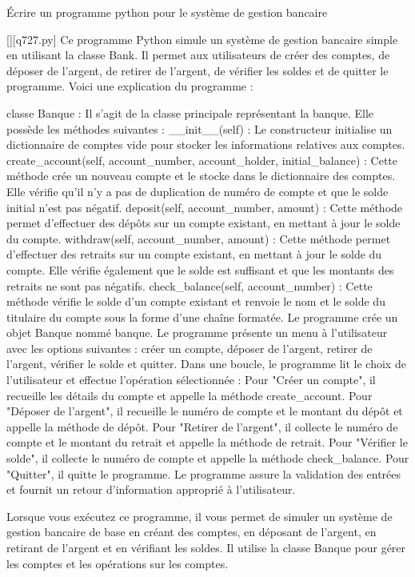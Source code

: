         \question
        Écrire un programme python pour le système de gestion bancaire
        \par
        \begin{solution}
            \renewcommand{\nomfichier}{q727.py}
            \pythonfile{\chemincode \nomfichier}[][\nomfichier]
            Ce programme Python simule un système de gestion bancaire simple en utilisant la classe Bank. Il permet aux utilisateurs de créer des comptes, de déposer de l'argent, de retirer de l'argent, de vérifier les soldes et de quitter le programme. Voici une explication du programme :

    classe Banque : Il s'agit de la classe principale représentant la banque. Elle possède les méthodes suivantes :
        \_\_init\_\_(self) : Le constructeur initialise un dictionnaire de comptes vide pour stocker les informations relatives aux comptes.
        create\_account(self, account\_number, account\_holder, initial\_balance) : Cette méthode crée un nouveau compte et le stocke dans le dictionnaire des comptes. Elle vérifie qu'il n'y a pas de duplication de numéro de compte et que le solde initial n'est pas négatif.
        deposit(self, account\_number, amount) : Cette méthode permet d'effectuer des dépôts sur un compte existant, en mettant à jour le solde du compte.
        withdraw(self, account\_number, amount) : Cette méthode permet d'effectuer des retraits sur un compte existant, en mettant à jour le solde du compte. Elle vérifie également que le solde est suffisant et que les montants des retraits ne sont pas négatifs.
        check\_balance(self, account\_number) : Cette méthode vérifie le solde d'un compte existant et renvoie le nom et le solde du titulaire du compte sous la forme d'une chaîne formatée.
    Le programme crée un objet Banque nommé banque.
    Le programme présente un menu à l'utilisateur avec les options suivantes : créer un compte, déposer de l'argent, retirer de l'argent, vérifier le solde et quitter.
    Dans une boucle, le programme lit le choix de l'utilisateur et effectue l'opération sélectionnée :
        Pour "Créer un compte", il recueille les détails du compte et appelle la méthode create\_account.
        Pour "Déposer de l'argent", il recueille le numéro de compte et le montant du dépôt et appelle la méthode de dépôt.
        Pour "Retirer de l'argent", il collecte le numéro de compte et le montant du retrait et appelle la méthode de retrait.
        Pour "Vérifier le solde", il collecte le numéro de compte et appelle la méthode check\_balance.
        Pour "Quitter", il quitte le programme.
    Le programme assure la validation des entrées et fournit un retour d'information approprié à l'utilisateur.

Lorsque vous exécutez ce programme, il vous permet de simuler un système de gestion bancaire de base en créant des comptes, en déposant de l'argent, en retirant de l'argent et en vérifiant les soldes. Il utilise la classe Banque pour gérer les comptes et les opérations sur les comptes.
        \end{solution}
        

